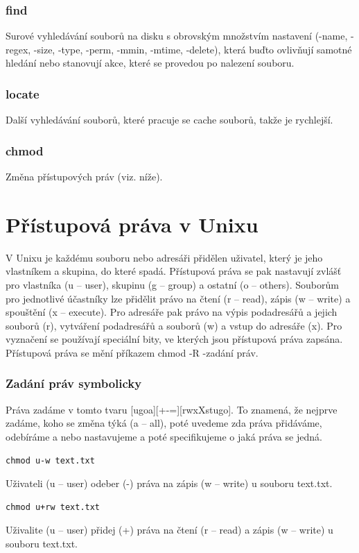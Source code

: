 \documentclass{article}
\begin{document}
\subsubsection{find}
Surové vyhledávání souborů na disku s obrovským množstvím nastavení (-name, -regex, -size, -type, -perm, -mmin, -mtime, -delete), která buďto ovlivňují samotné hledání nebo stanovují akce, které se provedou po nalezení souboru.

\subsubsection{locate}
Další vyhledávání souborů, které pracuje se cache souborů, takže je rychlejší.

\subsubsection{chmod}
Změna přístupových práv (viz. níže).

\section{Přístupová práva v Unixu}
V Unixu je každému souboru nebo adresáři přidělen uživatel, který je jeho vlastníkem a skupina, do které spadá. Přístupová práva se pak nastavují zvlášť pro vlastníka (u -- user), skupinu (g -- group) a ostatní (o -- others). Souborům pro jednotlivé účastníky lze přidělit právo na čtení (r -- read), zápis (w -- write) a spouštění (x -- execute). Pro adresáře pak právo na výpis podadresářů a jejich souborů (r), vytváření podadresářů a souborů (w) a vstup do adresáře (x). Pro vyznačení se používají speciální bity, ve kterých jsou přístupová práva zapsána. Přístupová práva se mění příkazem chmod -R -zadání práv.
\subsubsection{Zadání práv symbolicky}
Práva zadáme v tomto tvaru [ugoa][+-=][rwxXstugo]. To znamená, že nejprve zadáme, koho se změna týká (a -- all), poté uvedeme zda práva přidáváme, odebíráme a nebo nastavujeme a poté specifikujeme o jaká práva se jedná.
\begin{verbatim}
chmod u-w text.txt
\end{verbatim}
Uživateli (u -- user) odeber (-) práva na zápis (w -- write) u souboru text.txt.

\begin{verbatim}
chmod u+rw text.txt
\end{verbatim}
Uživalite (u -- user) přidej (+) práva na čtení (r -- read) a zápis (w -- write) u souboru text.txt.
\end{document}
